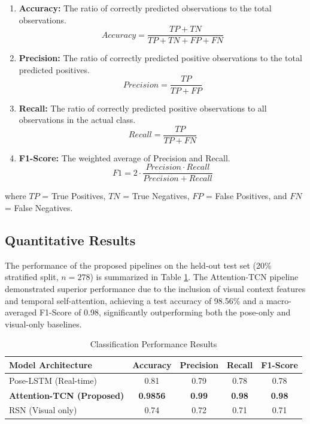 \documentclass[pdflatex,sn-mathphys-num]{sn-jnl}%
\theoremstyle{thmstyleone}%
\theoremstyle{thmstyletwo}%
\theoremstyle{thmstylethree}%
\begin{document}
\begin{enumerate}
    \item \textbf{Accuracy:} The ratio of correctly predicted observations to the total observations.
    \begin{equation}
        Accuracy = \frac{TP + TN}{TP + TN + FP + FN}
    \end{equation}
    
    \item \textbf{Precision:} The ratio of correctly predicted positive observations to the total predicted positives.
    \begin{equation}
        Precision = \frac{TP}{TP + FP}
    \end{equation}
    
    \item \textbf{Recall:} The ratio of correctly predicted positive observations to all observations in the actual class.
    \begin{equation}
        Recall = \frac{TP}{TP + FN}
    \end{equation}
    
    \item \textbf{F1-Score:} The weighted average of Precision and Recall.
    \begin{equation}
        F1 = 2 \cdot \frac{Precision \cdot Recall}{Precision + Recall}
    \end{equation}
\end{enumerate}
\noindent where $TP$ = True Positives, $TN$ = True Negatives, $FP$ = False Positives, and $FN$ = False Negatives.

\subsection{Quantitative Results}
The performance of the proposed pipelines on the held-out test set (20\% stratified split, $n=278$) is summarized in Table \ref{tab_results}. The Attention-TCN pipeline demonstrated superior performance due to the inclusion of visual context features and temporal self-attention, achieving a test accuracy of 98.56\% and a macro-averaged F1-Score of 0.98, significantly outperforming both the pose-only and visual-only baselines.

\begin{table}[h]
\caption{Classification Performance Results}\label{tab_results}
\centering
\setlength{\tabcolsep}{6pt}
\renewcommand{\arraystretch}{1.3}
\begin{tabular}{|l|c|c|c|c|}
\hline
\textbf{Model Architecture} & \textbf{Accuracy} & \textbf{Precision} & \textbf{Recall} & \textbf{F1-Score} \\
\hline
Pose-LSTM (Real-time) & 0.81 & 0.79 & 0.78 & 0.78 \\
\hline
\textbf{Attention-TCN (Proposed)} & \textbf{0.9856} & \textbf{0.99} & \textbf{0.98} & \textbf{0.98} \\
\hline
RSN (Visual only) & 0.74 & 0.72 & 0.71 & 0.71 \\
\hline
\end{tabular}
\end{table}
\end{document}
